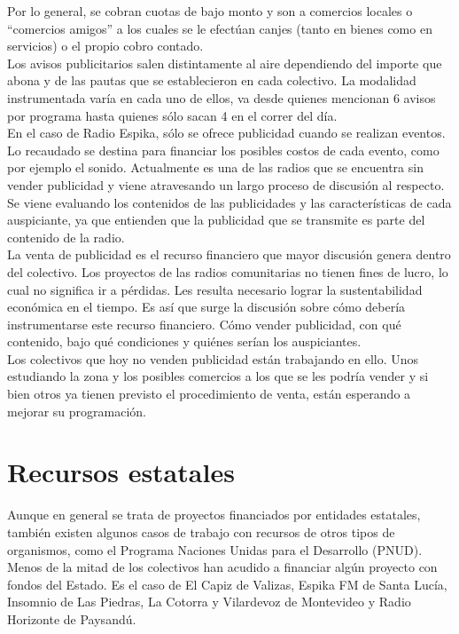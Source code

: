 Por lo general, se cobran cuotas de bajo monto y son a comercios locales o “comercios amigos” a los cuales se le efectúan canjes (tanto en bienes como en servicios) o el propio cobro contado.\\

Los avisos publicitarios salen distintamente al aire dependiendo del importe que abona y de las pautas que se establecieron en cada colectivo. La modalidad instrumentada varía en cada uno de ellos, va desde quienes mencionan 6 avisos por programa hasta quienes sólo sacan 4 en el correr del día.\\

En el caso de Radio Espika, sólo se ofrece publicidad cuando se realizan eventos. Lo recaudado se destina para financiar los posibles costos de cada evento, como por ejemplo el sonido. Actualmente es una de las radios que se encuentra sin vender publicidad y viene atravesando un largo proceso de discusión al respecto. Se viene evaluando los contenidos de las publicidades y las características de cada auspiciante, ya que entienden que la publicidad que se transmite es parte del contenido de la radio.\\

La venta de publicidad es el recurso financiero que mayor discusión genera dentro del colectivo. Los proyectos de las radios comunitarias no tienen fines de lucro, lo cual no significa ir a pérdidas. Les resulta necesario lograr la sustentabilidad económica en el tiempo. Es así que surge la discusión sobre cómo debería instrumentarse este recurso financiero. Cómo vender publicidad, con qué contenido, bajo qué condiciones y quiénes serían los auspiciantes.\\

Los colectivos que hoy no venden publicidad están trabajando en ello. Unos estudiando la zona y los posibles comercios a los que se les podría vender y si bien otros ya tienen previsto el procedimiento de venta, están esperando a mejorar su programación.\\

\section{Recursos estatales}

Aunque en general se trata de proyectos financiados por entidades estatales, también existen algunos casos de trabajo con recursos de otros tipos de organismos, como el Programa Naciones Unidas para el Desarrollo (PNUD). Menos de la mitad de los colectivos han acudido a financiar algún proyecto con fondos del Estado. Es el caso de El Capiz de Valizas, Espika FM de Santa Lucía, Insomnio de Las Piedras, La Cotorra y Vilardevoz de Montevideo y Radio Horizonte de Paysandú.\\

